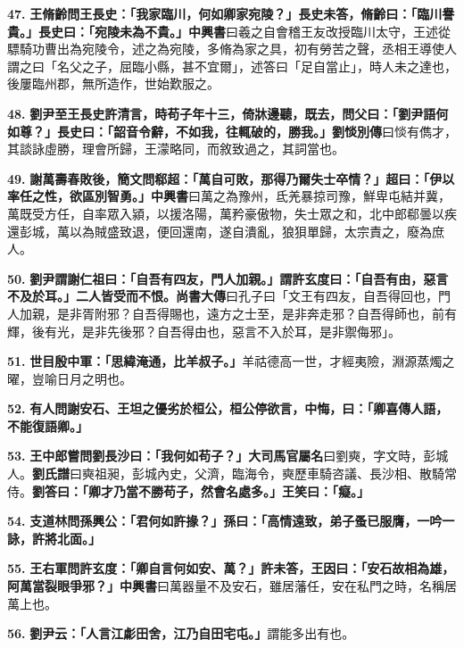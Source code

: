 \textbf{47.} \textbf{王脩齡問王長史：「我家臨川，何如卿家宛陵？」長史未答，脩齡曰：「臨川譽貴。」長史曰：「宛陵未為不貴。」}{\footnotesize \textbf{中興書}曰羲之自會稽王友改授臨川太守，王述從驃騎功曹出為宛陵令，述之為宛陵，多脩為家之具，初有勞苦之聲，丞相王導使人謂之曰「名父之子，屈臨小縣，甚不宜爾」，述答曰「足自當止」，時人未之達也，後屢臨州郡，無所造作，世始歎服之。}

\textbf{48.} \textbf{劉尹至王長史許清言，時苟子年十三，倚牀邊聽，既去，問父曰：「劉尹語何如尊？」長史曰：「韶音令辭，不如我，往輒破的，勝我。」}{\footnotesize \textbf{劉惔別傳}曰惔有儁才，其談詠虛勝，理會所歸，王濛略同，而敘致過之，其詞當也。}

\textbf{49.} \textbf{謝萬壽春敗後，簡文問郗超：「萬自可敗，那得乃爾失士卒情？」超曰：「伊以率任之性，欲區別智勇。」}{\footnotesize \textbf{中興書}曰萬之為豫州，氐羌暴掠司豫，鮮卑屯結并冀，萬既受方任，自率眾入潁，以援洛陽，萬矜豪傲物，失士眾之和，北中郎郗曇以疾還彭城，萬以為賊盛致退，便回還南，遂自潰亂，狼狽單歸，太宗責之，廢為庶人。}

\textbf{50.} \textbf{劉尹謂謝仁祖曰：「自吾有四友，門人加親。」謂許玄度曰：「自吾有由，惡言不及於耳。」二人皆受而不恨。}{\footnotesize \textbf{尚書大傳}曰孔子曰「文王有四友，自吾得回也，門人加親，是非胥附邪？自吾得賜也，遠方之士至，是非奔走邪？自吾得師也，前有輝，後有光，是非先後邪？自吾得由也，惡言不入於耳，是非禦侮邪」。}

\textbf{51.} \textbf{世目殷中軍：「思緯淹通，比羊叔子。」}{\footnotesize 羊祜德高一世，才經夷險，淵源蒸燭之曜，豈喻日月之明也。}

\textbf{52.} \textbf{有人問謝安石、王坦之優劣於桓公，桓公停欲言，中悔，曰：「卿喜傳人語，不能復語卿。」}

\textbf{53.} \textbf{王中郎嘗問劉長沙曰：「我何如苟子？」}{\footnotesize \textbf{大司馬官屬名}曰劉奭，字文時，彭城人。\textbf{劉氏譜}曰奭祖昶，彭城內史，父濟，臨海令，奭歷車騎咨議、長沙相、散騎常侍。}\textbf{劉答曰：「卿才乃當不勝苟子，然會名處多。」王笑曰：「癡。」}

\textbf{54.} \textbf{支道林問孫興公：「君何如許掾？」孫曰：「高情遠致，弟子蚤已服膺，一吟一詠，許將北面。」}

\textbf{55.} \textbf{王右軍問許玄度：「卿自言何如安、萬？」許未答，王因曰：「安石故相為雄，阿萬當裂眼爭邪？」}{\footnotesize \textbf{中興書}曰萬器量不及安石，雖居藩任，安在私門之時，名稱居萬上也。}

\textbf{56.} \textbf{劉尹云：「人言江虨田舍，江乃自田宅屯。」}{\footnotesize 謂能多出有也。}

